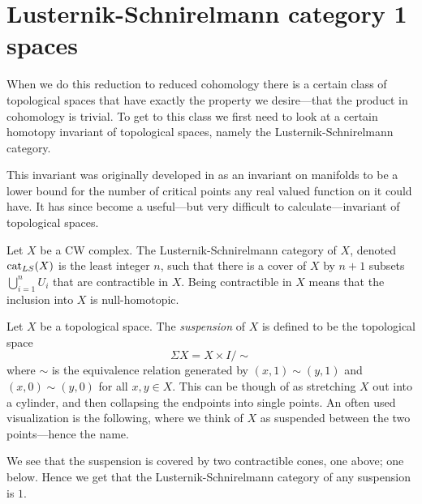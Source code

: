\section{Lusternik-Schnirelmann category 1 spaces}

When we do this reduction to reduced cohomology there is a certain class of topological spaces that have exactly the property we desire---that the product in cohomology is trivial. To get to this class we first need to look at a certain homotopy invariant of topological spaces, namely the Lusternik-Schnirelmann category. 

This invariant was originally developed in \cite{lscat} as an invariant on manifolds to be a lower bound for the number of critical points any real valued function on it could have. It has since become a useful---but very difficult to calculate---invariant of topological spaces. 

\begin{definition}
\label{def:ls_category}
\label{Lusternik-Schnirelmann category}
Let $X$ be a CW complex. The Lusternik-Schnirelmann category of $X$, denoted $\text{cat}_{LS}(X)$ is the least integer $n$, such that there is a cover of $X$ by $n+1$ subsets $\bigcup_{i=1}^n U_i$ that are contractible in $X$. Being contractible in $X$ means that the inclusion into $X$ is null-homotopic. 
\end{definition}

\begin{example}
\label{ex:suspension}
Let $X$ be a topological space. The \emph{suspension} of $X$ is defined to be the topological space
\begin{equation*}
	\Sigma X = X\times I/\sim
\end{equation*}
where $\sim$ is the equivalence relation generated by $(x,1)\sim (y,1)$ and $(x,0)\sim (y,0)$ for all $x,y\in X$. This can be though of as stretching $X$ out into a cylinder, and then collapsing the endpoints into single points. An often used visualization is the following, where we think of $X$ as suspended between the two points---hence the name.
\begin{center}
\def\svgwidth{0.6\textwidth}

\end{center}
We see that the suspension is covered by two contractible cones, one above; one below. Hence we get that the Lusternik-Schnirelmann category of any suspension is $1$. 
\end{example}

